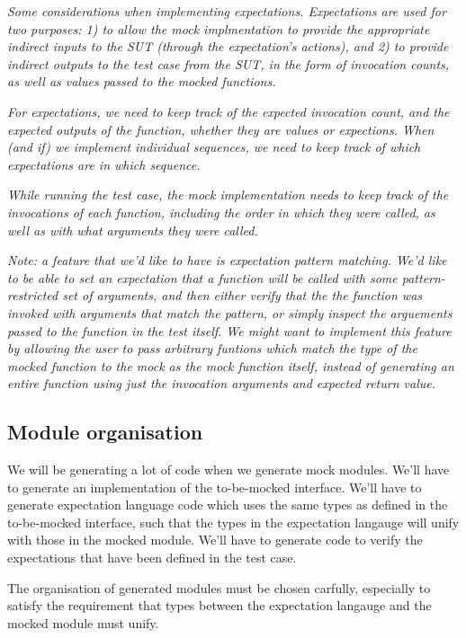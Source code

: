 \textit{Some considerations when implementing
  expectations. Expectations are used for two purposes: 1) to allow
  the mock implmentation to provide the appropriate indirect inputs to
  the SUT (through the expectation's actions), and 2) to provide
  indirect outputs to the test case from the SUT, in the form of
  invocation counts, as well as values passed to the mocked
  functions.}

\textit{For expectations, we need to keep track of the expected
  invocation count, and the expected outputs of the function, whether
  they are values or expections. When (and if) we implement individual
  sequences, we need to keep track of which expectations are in which
  sequence.}

\textit{While running the test case, the mock implementation needs to
  keep track of the invocations of each function, including the order
  in which they were called, as well as with what arguments they were
  called.}

\textit{Note: a feature that we'd like to have is expectation pattern
  matching. We'd like to be able to set an expectation that a function
  will be called with some pattern-restricted set of arguments, and
  then either verify that the the function was invoked with arguments
  that match the pattern, or simply inspect the arguements passed to
  the function in the test itself. We might want to implement this
  feature by allowing the user to pass arbitrary funtions which match
  the type of the mocked function to the mock as the mock function
  itself, instead of generating an entire function using just the
  invocation arguments and expected return value.}

\subsection{Module organisation}

We will be generating a lot of code when we generate mock
modules. We'll have to generate an implementation of the to-be-mocked
interface. We'll have to generate expectation language code which uses
the same types as defined in the to-be-mocked interface, such that
the types in the expectation langauge will unify with those in the
mocked module. We'll have to generate code to verify the expectations
that have been defined in the test case.

The organisation of generated modules must be chosen carfully,
especially to satisfy the requirement that types between the
expectation langauge and the mocked module must unify.

